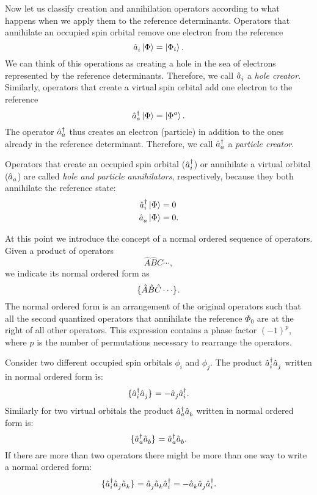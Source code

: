 \documentclass[../Main/chem532-notes.tex]{subfiles}
\begin{document}
Now let us classify creation and annihilation operators according to what happens when we apply them to the reference determinants.
Operators that annihilate an occupied spin orbital remove one electron from the reference
\begin{equation}
\hat{a}_{i}^{\,} \ket{\Phi} = \ket{\Phi_i}.
\end{equation}
We can think of this operations as creating a hole in the sea of electrons represented by the reference determinants. Therefore, we call $\hat{a}_{i}^{\,}$ a \textit{hole creator}.
Similarly, operators that create a virtual spin orbital add one electron to the reference
\begin{equation}
\hat{a}_{a}^{\dagger} \ket{\Phi} = \ket{\Phi^a}.
\end{equation}
The operator $\hat{a}_{a}^{\dagger}$ thus creates an electron (particle) in addition to the ones already in the reference determinant. Therefore, we call $\hat{a}_{a}^{\dagger}$ a \textit{particle creator}.

Operators that create an occupied spin orbital ($\hat{a}_{i}^{\dagger}$) or annihilate a virtual orbital ($\hat{a}_{a}^{\,}$) are called \textit{hole and particle annihilators}, respectively, because they both annihilate the reference state:
\begin{align}
\hat{a}_{i}^{\dagger} \ket{\Phi} &= 0 \\
\hat{a}_{a}^{\,} \ket{\Phi} &= 0.
\end{align}

At this point we introduce the concept of a normal ordered sequence of operators.
Given a product of operators
\begin{equation}
\hat{A} \hat{B} \hat{C} \cdots,
\end{equation}
we indicate its normal ordered form as
\begin{equation}
\{{\hat{A} \hat{B} \hat{C} \cdots}\}_{}.
\end{equation}
The normal ordered form is an arrangement of the original operators such that all the second quantized operators that annihilate the reference $\Phi_0$ are at the right of all other operators. This expression contains a phase factor $(-1)^p$, where $p$ is the number of permutations necessary to rearrange the operators.

Consider two different occupied spin orbitals $\phi_i$ and $\phi_j$. The product $\hat{a}_{i}^{\dagger}\hat{a}_{j}^{\,}$ written in normal ordered form is:
\begin{equation}
\{{\hat{a}_{i}^{\dagger}\hat{a}_{j}^{\,}}\}_{} = - \hat{a}_{j}^{\,}\hat{a}_{i}^{\dagger}.
\end{equation}
Similarly for two virtual orbitals the product $\hat{a}_{a}^{\dagger}\hat{a}_{b}^{\,}$ written in normal ordered form is:
\begin{equation}
\{{\hat{a}_{a}^{\dagger}\hat{a}_{b}^{\,}}\}_{} = \hat{a}_{a}^{\dagger}\hat{a}_{b}^{\,}.
\end{equation}
If there are more than two operators there might be more than one way to write a normal ordered form:
\begin{equation}
\{{\hat{a}_{i}^{\dagger}\hat{a}_{j}^{\,}\hat{a}_{k}^{\,}}\}_{} = \hat{a}_{j}^{\,}\hat{a}_{k}^{\,}\hat{a}_{i}^{\dagger} = -\hat{a}_{k}^{\,}\hat{a}_{j}^{\,}\hat{a}_{i}^{\dagger}.
\end{equation}
\end{document}
